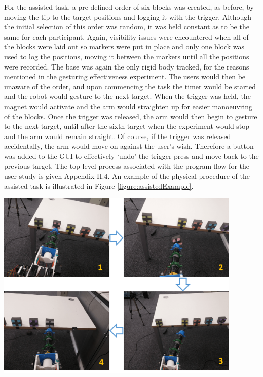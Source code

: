 \documentclass[11pt]{article}
\begin{document}
For the assisted task, a pre-defined order of six blocks was created, as before, by moving the tip to the target positions and logging it with the trigger. Although the initial selection of this order was random, it was held constant as to be the same for each participant. Again, visibility issues were encountered when all of the blocks were laid out so markers were put in place and only one block was used to log the positions, moving it between the markers until all the positions were recorded. The base was again the only rigid body tracked, for the reasons mentioned in the gesturing effectiveness experiment. The users would then be unaware of the order, and upon commencing the task the timer would be started and the robot would gesture to the next target. When the trigger was held, the magnet would activate and the arm would straighten up for easier manoeuvring of the blocks. Once the trigger was released, the arm would then begin to gesture to the next target, until after the sixth target when the experiment would stop and the arm would remain straight. Of course, if the trigger was released accidentally, the arm would move on against the user's wish. Therefore a button was added to the GUI to effectively `undo' the trigger press and move back to the previous target. The top-level process associated with the program flow for the user study is given Appendix H.4. An example of the physical procedure of the assisted task is illustrated in Figure \ref{figure:assistedExample}.



\begin{center}
\includegraphics[width=0.88\textwidth]{images/assistedExample.png}
\label{figure:assistedExample}
\end{center}
\end{document}

